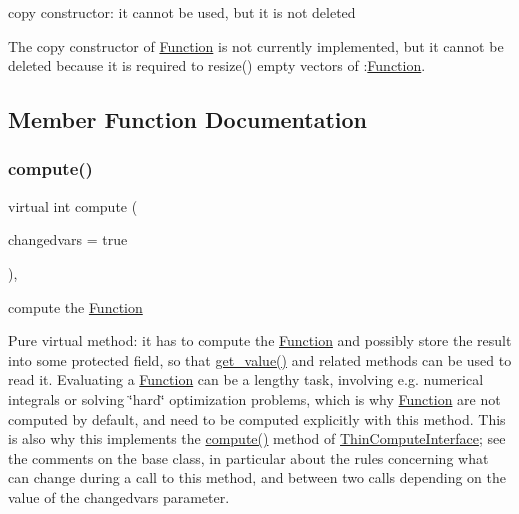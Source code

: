 copy constructor\+: it cannot be used, but it is not deleted 

The copy constructor of \mbox{\hyperlink{class_s_m_spp__di__unipi__it_1_1_function}{Function}} is not currently implemented, but it cannot be deleted because it is required to resize() empty vectors of \+:\mbox{\hyperlink{class_s_m_spp__di__unipi__it_1_1_function}{Function}}. 

\subsection{Member Function Documentation}
\mbox{\label{class_s_m_spp__di__unipi__it_1_1_function_a504d4e3e174c7a518cc66156a8a45ce5}} 
\subsubsection{\texorpdfstring{compute()}{compute()}}
{\footnotesize\ttfamily virtual int compute (\begin{DoxyParamCaption}\item[{bool}]{changedvars = {\ttfamily true} }\end{DoxyParamCaption})\hspace{0.3cm}{\ttfamily [override]}, {}}



compute the \mbox{\hyperlink{class_s_m_spp__di__unipi__it_1_1_function}{Function}} 

Pure virtual method\+: it has to compute the \mbox{\hyperlink{class_s_m_spp__di__unipi__it_1_1_function}{Function}} and possibly store the result into some protected field, so that \mbox{\hyperlink{class_s_m_spp__di__unipi__it_1_1_function_a040b4850ae0a23a1c9ff79b497b6eaaf}{get\+\_\+value()}} and related methods can be used to read it. Evaluating a \mbox{\hyperlink{class_s_m_spp__di__unipi__it_1_1_function}{Function}} can be a lengthy task, involving e.\+g. numerical integrals or solving \char`\"{}hard\char`\"{} optimization problems, which is why \mbox{\hyperlink{class_s_m_spp__di__unipi__it_1_1_function}{Function}} are not computed by default, and need to be computed explicitly with this method. This is also why this implements the \mbox{\hyperlink{class_s_m_spp__di__unipi__it_1_1_function_a504d4e3e174c7a518cc66156a8a45ce5}{compute()}} method of \mbox{\hyperlink{class_s_m_spp__di__unipi__it_1_1_thin_compute_interface}{Thin\+Compute\+Interface}}; see the comments on the base class, in particular about the rules concerning what can change during a call to this method, and between two calls depending on the value of the changedvars parameter.

